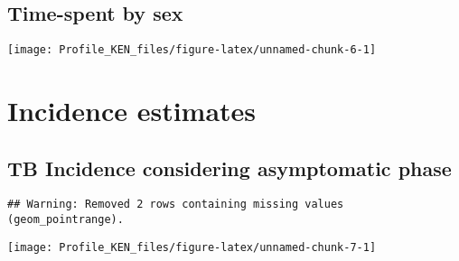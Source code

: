 \documentclass[
]{article}
\begin{document}
\hypertarget{time-spent-by-sex}{%
\subsection{Time-spent by sex}\label{time-spent-by-sex}}

\texttt{[image: Profile\_KEN\_files/figure-latex/unnamed-chunk-6-1]}

\newpage

\hypertarget{incidence-estimates}{%
\section{Incidence estimates}\label{incidence-estimates}}

\hypertarget{tb-incidence-considering-asymptomatic-phase}{%
\subsection{TB Incidence considering asymptomatic
phase}\label{tb-incidence-considering-asymptomatic-phase}}

\begin{verbatim}
## Warning: Removed 2 rows containing missing values (geom_pointrange).
\end{verbatim}

\texttt{[image: Profile\_KEN\_files/figure-latex/unnamed-chunk-7-1]}
\end{document}
